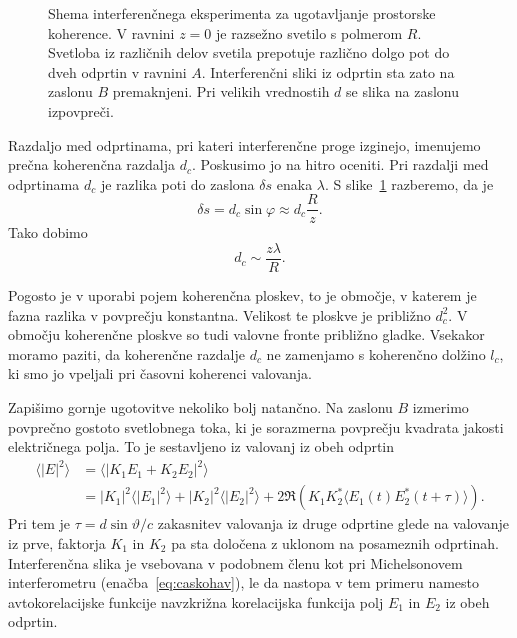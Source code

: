 \begin{figure}[ht]
\centering
\def\svgwidth{123truemm} 

\caption{Shema interferenčnega eksperimenta za ugotavljanje prostorske koherence. 
V ravnini $z=0$ je razsežno svetilo s polmerom $R$. 
Svetloba iz različnih delov svetila prepotuje različno dolgo pot do dveh odprtin 
v ravnini $A$. Interferenčni sliki iz odprtin sta zato na zaslonu $B$ premaknjeni.
Pri velikih vrednostih $d$ se slika na zaslonu izpovpreči.}
\label{fig:shema-interferenca}
\end{figure}

Razdaljo med odprtinama, pri kateri interferenčne proge
izginejo, imenujemo prečna koherenčna razdalja $d_c$. 
Poskusimo jo na hitro oceniti. Pri razdalji med odprtinama $d_c$ je razlika poti do zaslona $\delta s$
enaka $\lambda$. S slike~\ref{fig:shema-interferenca} razberemo, da je 
\begin{equation}
\delta s = d_c\sin\varphi\approx d_c\frac{R}{z}.
\end{equation}
Tako dobimo 
\begin{equation}
d_{c}\sim\frac{z\lambda}{R}.
\label{eq:prost_koh}
\end{equation}
\begin{remark}
Pogosto je v uporabi
pojem koherenčna ploskev, to je območje, 
v katerem je fazna razlika v povprečju konstantna. Velikost te ploskve je približno $d_{c}^{2}$.
V območju koherenčne ploskve so tudi valovne fronte približno gladke.
Vsekakor moramo paziti, da koherenčne razdalje $d_c$ ne zamenjamo
s koherenčno dolžino $l_c$, ki smo jo vpeljali pri časovni koherenci valovanja. 
\end{remark}

Zapišimo gornje ugotovitve nekoliko bolj natančno. Na zaslonu $B$
izmerimo povprečno gostoto svetlobnega toka, ki je sorazmerna povprečju kvadrata
jakosti električnega polja. To je sestavljeno iz valovanj iz obeh odprtin
\begin{align}
\langle|E|^{2}\rangle & =\langle|K_{1}E_{1}+K_{2}E_{2}|^{2}\rangle\nonumber \\
&=  |K_{1}|^{2}\langle|E_{1}|^{2}\rangle+|K_{2}|^{2}\langle|E_{2}|^{2}\rangle+
2\Re \left( K_{1}K_{2}^{*}\langle E_{1}(t)E_{2}^{*}(t+\tau)\rangle\right)\!\!.
\end{align}
Pri tem je $\tau=d\sin\vartheta/c$ zakasnitev valovanja iz druge odprtine
glede na valovanje iz prve, faktorja $K_{1}$ in $K_{2}$ pa sta določena
z uklonom na posameznih odprtinah. Interferenčna slika je vsebovana v podobnem 
členu kot pri Michelsonovem interferometru (enačba~\ref{eq:caskohav}), 
le da nastopa v tem primeru namesto avtokorelacijske funkcije
navzkrižna korelacijska funkcija polj $E_{1}$ in $E_{2}$ iz obeh 
odprtin. 

